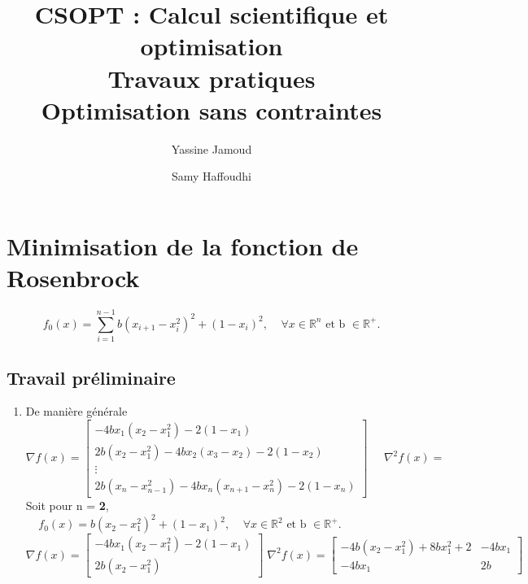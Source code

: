 \documentclass[a4paper, 10pt]{article}
\title{CSOPT : Calcul scientifique et optimisation \\ Travaux pratiques \\ Optimisation sans contraintes }
\author{Yassine Jamoud \and Samy Haffoudhi}
\begin{document}
	\maketitle
	
	\newpage
	
	\section{Minimisation de la fonction de Rosenbrock}
			$$
			f_0(x)= \sum_{i=1}^{n-1} b(x_{i+1}-x_i^2)^2 + (1-x_i)^2, \;\;\;\;    \forall x \in \mathbb{R}^n \mbox{ et b }  \in \mathbb{R}^+.
			$$
		\subsection{Travail préliminaire}
			\begin{enumerate}
				\item{
					De manière générale 
					$$
					\nabla f(x) = \left[
					\begin{array}{c}
					-4bx_1(x_2-x_1^2)-2(1-x_1) \\
					2b(x_2-x_1^2)-4bx_2(x_3-x_2)-2(1-x_2) \\
					\vdots \\
					2b(x_n-x_{n-1}^2)-4bx_n(x_{n+1}-x_n^2)-2(1-x_n)
					\end{array}
					\right]
					\;\;\;\;\;
					\nabla ^2 f(x)=
					$$
					Soit pour n = \textbf{2}, $ \;\;\;\;  f_0(x) = b(x_2-x_1^2)^2+(1-x_1)^2, \;\;\;\;    \forall x \in \mathbb{R}^2 \mbox{ et b }  \in \mathbb{R}^+.$
					$$
					\nabla f(x) = \left[
					\begin{array}{c}
					-4bx_1(x_2-x_1^2) - 2(1-x_1)\\
					2b(x_2-x_1^2)
					\end{array}
					\right]
					\;
					\nabla ^2f(x)=\left[
					\begin{array}{cc}
					-4b(x_2-x_1^2)+8bx_1^2 +2 & -4bx_1\\
					-4bx_1 & 2b
					\end{array}
					\right]
					$$
				}
				

\end{enumerate}
\end{document}

